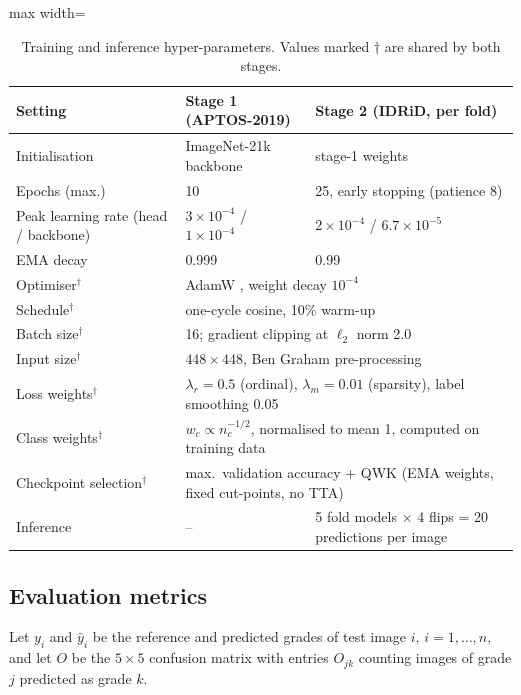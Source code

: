 \begin{table}[!htbp]
\centering\small
\caption{Training and inference hyper-parameters. Values marked $\dagger$ are shared by both stages.}
\label{tab:hparams}
\begin{adjustbox}{max width=\linewidth}
\begin{tabular}{@{}lll@{}}
\toprule
Setting & Stage 1 (APTOS-2019) & Stage 2 (IDRiD, per fold)\\
\midrule
Initialisation & ImageNet-21k backbone & stage-1 weights\\
Epochs (max.) & 10 & 25, early stopping (patience 8)\\
Peak learning rate (head / backbone) & $3\times10^{-4}$ / $1\times10^{-4}$ & $2\times10^{-4}$ / $6.7\times10^{-5}$\\
EMA decay & 0.999 & 0.99\\
Optimiser$^\dagger$ & \multicolumn{2}{l}{AdamW \citep{loshchilov2019decoupled}, weight decay $10^{-4}$}\\
Schedule$^\dagger$ & \multicolumn{2}{l}{one-cycle cosine, 10\% warm-up \citep{smith2019super}}\\
Batch size$^\dagger$ & \multicolumn{2}{l}{16; gradient clipping at $\ell_2$ norm 2.0}\\
Input size$^\dagger$ & \multicolumn{2}{l}{$448\times448$, Ben Graham pre-processing}\\
Loss weights$^\dagger$ & \multicolumn{2}{l}{$\lambda_r=0.5$ (ordinal), $\lambda_m=0.01$ (sparsity), label smoothing 0.05}\\
Class weights$^\dagger$ & \multicolumn{2}{l}{$w_c\propto n_c^{-1/2}$, normalised to mean 1, computed on training data}\\
Checkpoint selection$^\dagger$ & \multicolumn{2}{l}{max.\ validation accuracy + QWK (EMA weights, fixed cut-points, no TTA)}\\
Inference & -- & 5 fold models $\times$ 4 flips = 20 predictions per image\\
\bottomrule
\end{tabular}
\end{adjustbox}
\end{table}

\subsection{Evaluation metrics}
Let $y_i$ and $\hat y_i$ be the reference and predicted grades of test image $i$, $i=1,\dots,n$, and let $O$ be the
$5\times5$ confusion matrix with entries $O_{jk}$ counting images of grade $j$ predicted as grade $k$.

